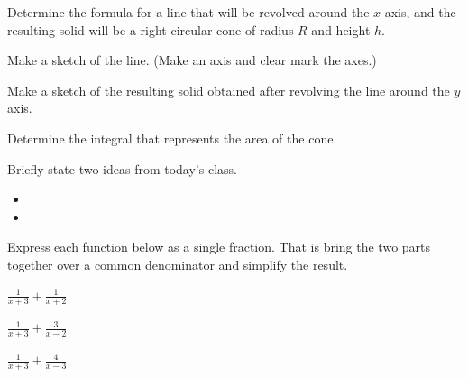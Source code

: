 \begin{problem}
\item Determine the formula for a line that will be revolved
      around the $x$-axis, and the resulting solid will be a right
      circular cone of radius $R$ and height $h$.
  \begin{subproblem}
    \item Make a sketch of the line. (Make an axis and clear mark the
      axes.)
      \vfill

    \item Make a sketch of the resulting solid obtained after
      revolving the line around the $y$ axis.
      \vfill

    \item Determine the integral that represents the area of the cone.
      \vfill
      
  \end{subproblem}
\end{problem}

\postClass

\begin{problem}
\item Briefly state two ideas from today's class.
  \begin{itemize}
  \item 
  \item 
  \end{itemize}
\item 
  \begin{subproblem}
    \item
  \end{subproblem}
\end{problem}



\begin{problem}
\item Express each function below as a single fraction. That is bring
  the two parts together over a common denominator and simplify the
  result.
  \begin{subproblem}
  \item $\frac{1}{x+3} + \frac{1}{x+2}$
    \vfill
  \item $\frac{1}{x+3} + \frac{3}{x-2}$
    \vfill
  \item $\frac{1}{x+3} + \frac{4}{x-3}$
    \vfill
  \end{subproblem}
\end{problem}


